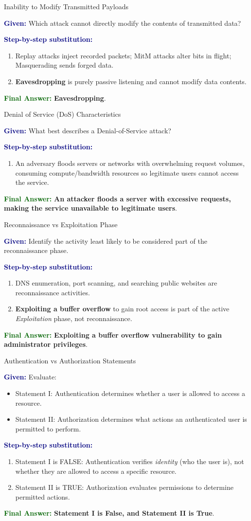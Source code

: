 \documentclass[11pt,a4paper,openany]{report}
\newcommand{\Given}{\par\textbf{\textcolor{navy}{Given:}} }
\newcommand{\Steps}{\par\textbf{\textcolor{navy}{Step-by-step substitution:}}\par}
\newcommand{\Answer}{\par\textbf{\textcolor{darkgreen}{Final Answer:}} }
\begin{document}
\begin{solved}{Inability to Modify Transmitted Payloads}
\Given Which attack cannot directly modify the contents of transmitted data?
\Steps
\begin{enumerate}[leftmargin=*]
  \item Replay attacks inject recorded packets; MitM attacks alter bits in flight; Masquerading sends forged data.
  \item \textbf{Eavesdropping} is purely passive listening and cannot modify data contents.
\end{enumerate}
\Answer \textbf{Eavesdropping}.
\end{solved}

\begin{solved}{Denial of Service (DoS) Characteristics}
\Given What best describes a Denial-of-Service attack?
\Steps
\begin{enumerate}[leftmargin=*]
  \item An adversary floods servers or networks with overwhelming request volumes, consuming compute/bandwidth resources so legitimate users cannot access the service.
\end{enumerate}
\Answer \textbf{An attacker floods a server with excessive requests, making the service unavailable to legitimate users}.
\end{solved}

\begin{solved}{Reconnaissance vs Exploitation Phase}
\Given Identify the activity least likely to be considered part of the reconnaissance phase.
\Steps
\begin{enumerate}[leftmargin=*]
  \item DNS enumeration, port scanning, and searching public websites are reconnaissance activities.
  \item \textbf{Exploiting a buffer overflow} to gain root access is part of the active \emph{Exploitation} phase, not reconnaissance.
\end{enumerate}
\Answer \textbf{Exploiting a buffer overflow vulnerability to gain administrator privileges}.
\end{solved}

\begin{solved}{Authentication vs Authorization Statements}
\Given Evaluate:
\begin{itemize}
  \item Statement I: Authentication determines whether a user is allowed to access a resource.
  \item Statement II: Authorization determines what actions an authenticated user is permitted to perform.
\end{itemize}
\Steps
\begin{enumerate}[leftmargin=*]
  \item Statement I is FALSE: Authentication verifies \emph{identity} (who the user is), not whether they are allowed to access a specific resource.
  \item Statement II is TRUE: Authorization evaluates permissions to determine permitted actions.
\end{enumerate}
\Answer \textbf{Statement I is False, and Statement II is True}.
\end{solved}
\end{document}

